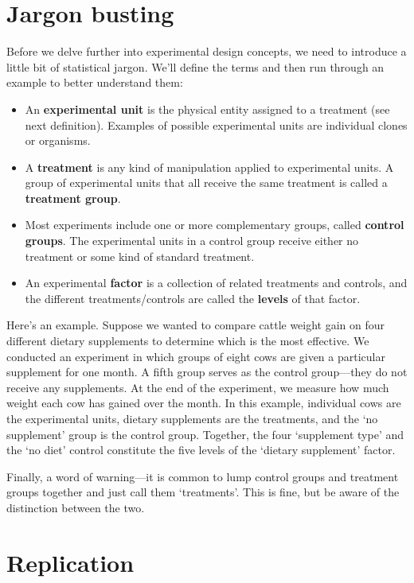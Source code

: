 \documentclass[
]{book}
\begin{document}
\hypertarget{jargon-busting}{%
\section{Jargon busting}\label{jargon-busting}}

Before we delve further into experimental design concepts, we need to introduce a little bit of statistical jargon. We'll define the terms and then run through an example to better understand them:

\begin{itemize}
\item
  An \textbf{experimental unit} is the physical entity assigned to a treatment (see next definition). Examples of possible experimental units are individual clones or organisms.
\item
  A \textbf{treatment} is any kind of manipulation applied to experimental units. A group of experimental units that all receive the same treatment is called a \textbf{treatment group}.
\item
  Most experiments include one or more complementary groups, called \textbf{control groups}. The experimental units in a control group receive either no treatment or some kind of standard treatment.
\item
  An experimental \textbf{factor} is a collection of related treatments and controls, and the different treatments/controls are called the \textbf{levels} of that factor.
\end{itemize}

Here's an example. Suppose we wanted to compare cattle weight gain on four different dietary supplements to determine which is the most effective. We conducted an experiment in which groups of eight cows are given a particular supplement for one month. A fifth group serves as the control group---they do not receive any supplements. At the end of the experiment, we measure how much weight each cow has gained over the month. In this example, individual cows are the experimental units, dietary supplements are the treatments, and the `no supplement' group is the control group. Together, the four `supplement type' and the `no diet' control constitute the five levels of the `dietary supplement' factor.

Finally, a word of warning---it is common to lump control groups and treatment groups together and just call them `treatments'. This is fine, but be aware of the distinction between the two.

\hypertarget{replication}{%
\section{Replication}\label{replication}}
\end{document}
